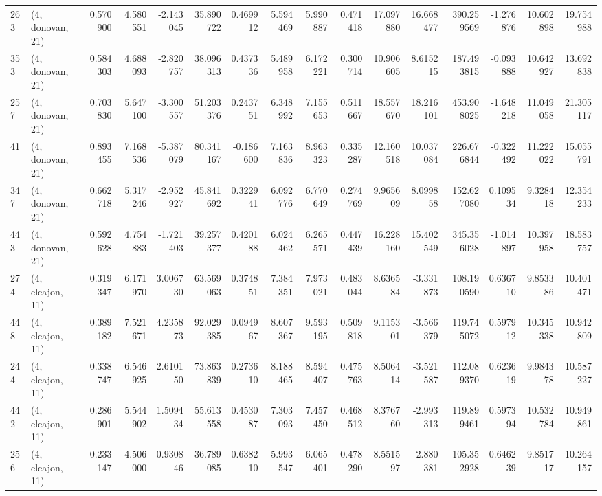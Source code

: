 \begin{tabular}{llrrrrrrrrrrrrrr}
263 &  (4, donovan, 21) &   0.570900 &   4.580551 &  -2.143045 &    35.890722 &   0.469912 &   5.594469 &   5.990887 &  0.471418 &  17.097880 &  16.668477 &   390.259569 & -1.276876 &  10.602898 &  19.754988 \\
353 &  (4, donovan, 21) &   0.584303 &   4.688093 &  -2.820757 &    38.096313 &   0.437336 &   5.489958 &   6.172221 &  0.300714 &  10.906605 &   8.615215 &   187.493815 & -0.093888 &  10.642927 &  13.692838 \\
257 &  (4, donovan, 21) &   0.703830 &   5.647100 &  -3.300557 &    51.203376 &   0.243751 &   6.348992 &   7.155653 &  0.511667 &  18.557670 &  18.216101 &   453.908025 & -1.648218 &  11.049058 &  21.305117 \\
41  &  (4, donovan, 21) &   0.893455 &   7.168536 &  -5.387079 &    80.341167 &  -0.186600 &   7.163836 &   8.963323 &  0.335287 &  12.160518 &  10.037084 &   226.676844 & -0.322492 &  11.222022 &  15.055791 \\
347 &  (4, donovan, 21) &   0.662718 &   5.317246 &  -2.952927 &    45.841692 &   0.322941 &   6.092776 &   6.770649 &  0.274769 &   9.965609 &   8.099858 &   152.627080 &  0.109534 &   9.328418 &  12.354233 \\
443 &  (4, donovan, 21) &   0.592628 &   4.754883 &  -1.721403 &    39.257377 &   0.420188 &   6.024462 &   6.265571 &  0.447439 &  16.228160 &  15.402549 &   345.356028 & -1.014897 &  10.397958 &  18.583757 \\
274 &  (4, elcajon, 11) &   0.319347 &   6.171970 &   3.006730 &    63.569063 &   0.374851 &   7.384351 &   7.973021 &  0.483044 &   8.636584 &  -3.331873 &   108.190590 &  0.636710 &   9.853386 &  10.401471 \\
448 &  (4, elcajon, 11) &   0.389182 &   7.521671 &   4.235873 &    92.029385 &   0.094967 &   8.607367 &   9.593195 &  0.509818 &   9.115301 &  -3.566379 &   119.745072 &  0.597912 &  10.345338 &  10.942809 \\
244 &  (4, elcajon, 11) &   0.338747 &   6.546925 &   2.610150 &    73.863839 &   0.273610 &   8.188465 &   8.594407 &  0.475763 &   8.506414 &  -3.521587 &   112.089370 &  0.623619 &   9.984378 &  10.587227 \\
442 &  (4, elcajon, 11) &   0.286901 &   5.544902 &   1.509434 &    55.613558 &   0.453087 &   7.303093 &   7.457450 &  0.468512 &   8.376760 &  -2.993313 &   119.899461 &  0.597394 &  10.532784 &  10.949861 \\
256 &  (4, elcajon, 11) &   0.233147 &   4.506000 &   0.930846 &    36.789085 &   0.638210 &   5.993547 &   6.065401 &  0.478290 &   8.551597 &  -2.880381 &   105.352928 &  0.646239 &   9.851717 &  10.264157 \\

\end{tabular}
